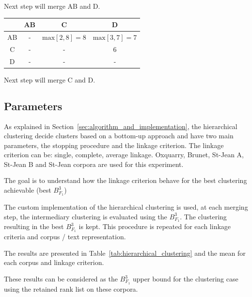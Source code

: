 \begin{example}
  \vspace{0.2cm}
  Next step will merge AB and D.

  \vspace{0.5cm}

  \begin{subexample}{\linewidth}
    \centering
    \begin{tabular}{c|c c c}
      \toprule
        & AB & C & D \\
      \midrule
      AB & - & $\text{max} \left[2, 8 \right] = 8$ & $\text{max} \left[3, 7 \right] = 7$ \\
      C  & - & - & 6 \\
      D  & - & - & - \\
      \bottomrule
    \end{tabular}
  \end{subexample}

  \vspace{0.2cm}
  Next step will merge C and D.
\end{example}


\subsection{Parameters\label{sec:hierarchical_clustering}}

As explained in Section~\ref{sec:algorithm_and_implementation}, the hierarchical clustering decide clusters based on a bottom-up approach and have two main parameters, the stopping procedure and the linkage criterion.
The linkage criterion can be: single, complete, average linkage.
Oxquarry, Brunet, St-Jean A, St-Jean B and St-Jean corpora are used for this experiment.

The goal is to understand how the linkage criterion behave for the best clustering achievable (best $B^3_{F_1}$)

The custom implementation of the hierarchical clustering is used, at each merging step, the intermediary clustering is evaluated using the $B^3_{F_1}$.
The clustering resulting in the best $B^3_{F_1}$ is kept.
This procedure is repeated for each linkage criteria and corpus / text representation.

The results are presented in Table~\ref{tab:hierarchical_clustering} and the mean for each corpus and linkage criterion.

These results can be considered as the $B^3_{F_1}$ upper bound for the clustering case using the retained rank list on these corpora.

